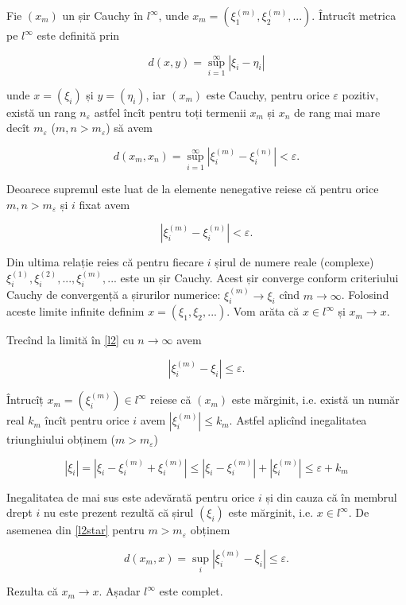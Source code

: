 \documentclass[a4paper,12pt]{article}
\theoremstyle{change}
\newenvironment{proof}[1][Proof]{\begin{trivlist}
\item[\hskip \labelsep {\bfseries #1}]}{\end{trivlist}}
\begin{document}
\begin{proof}[Într-adevăr]

Fie $(x_m)$ un șir Cauchy în $l^\infty$, unde $x_m=(\xi_1^{(m)},\xi_2^{(m)},...)$. Întrucît metrica pe $l^\infty$ este definită prin

\[ d(x,y) = \sup_{i=1}^{\infty} |\xi_i - \eta_i| \]

\noindent unde $x=(\xi_i)$ și $y=(\eta_i)$, iar $(x_m)$ este Cauchy, pentru orice $\varepsilon$ pozitiv, există un rang $n_{\varepsilon}$ astfel încît pentru toți termenii $x_m$ și $x_n$ de rang mai mare decît $m_{\varepsilon}$ ($m,n>m_{\varepsilon}$) să avem

\[ d(x_m,x_n) = \sup_{i=1}^{\infty} |\xi_i^{(m)} - \xi_i^{(n)}| < \varepsilon. \]

Deoarece supremul este luat de la elemente nenegative reiese că pentru orice $m,n>m_\varepsilon$ și $i$ fixat avem

\[
\label{l2}
|\xi_i^{(m)} - \xi_i^{(n)}| < \varepsilon.
\]

Din ultima relație reies că pentru fiecare $i$ șirul de numere reale (complexe) $\xi_i^{(1)}, \xi_i^{(2)}, ..., \xi_i^{(m)}, ...$ este un șir Cauchy. Acest șir converge conform criteriului Cauchy de convergență a șirurilor numerice: $\xi_i^{(m)}\to \xi_i$ cînd $m\to\infty$. Folosind aceste limite infinite definim $x=(\xi_1,\xi_2,...)$. Vom arăta că $x\in l^\infty$ și $x_m\to x$.

Trecînd la limită în \eqref{l2} cu $n\to\infty$ avem

\[
\label{l2star}
|\xi_i^{(m)} - \xi_i| \leq \varepsilon.
\]

Întrucîț $x_m=(\xi_i^{(m)})\in l^\infty$ reiese că $(x_m)$ este mărginit, i.e. există un număr real $k_m$ încît pentru orice $i$ avem $|\xi_i^{(m)}|\leq k_m$. Astfel aplicînd inegalitatea triunghiului obținem ($m>m_\varepsilon$)

\[
|\xi_i|=|\xi_i-\xi_i^{(m)}+\xi_i^{(m)}|\leq |\xi_i-\xi_i^{(m)}|+|\xi_i^{(m)}|\leq\varepsilon+k_m
\]

Inegalitatea de mai sus este adevărată pentru orice $i$ și din cauza că în membrul drept $i$ nu este prezent rezultă că șirul $(\xi_i)$ este mărginit, i.e. $x\in l^\infty$. De asemenea din \eqref{l2star} pentru $m>m_\varepsilon$ obținem

\[
d(x_m,x)=\sup_i |\xi_i^{(m)}-\xi_i|\leq \varepsilon.
\]

Rezulta că $x_m\to x$. Așadar $l^\infty$ este complet.

\end{proof}
\end{document}
